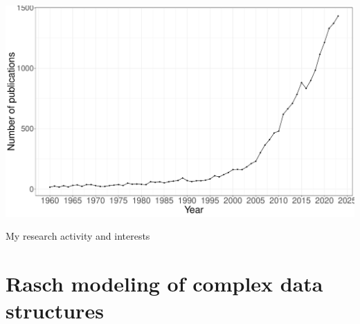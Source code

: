 \documentclass[aspectratio=149, xcolor=table]{beamer}
\begin{document}
\begin{frame}
	\centering
	\includegraphics[width=.80\linewidth]{freq-year.pdf}
\end{frame}

\begin{frame}{My research activity and interests}
	\tableofcontents
\end{frame}

\section[Rasch revised \& beyond]{Rasch modeling of complex data structures}
\end{document}
